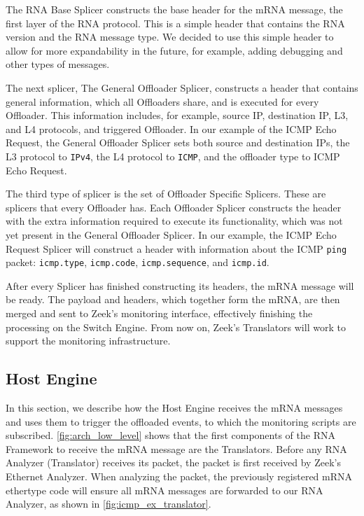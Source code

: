 The RNA Base Splicer constructs the base header for the mRNA message, the first layer of the RNA protocol. This is a simple header that contains the RNA version and the RNA message type. We decided to use this simple header to allow for more expandability in the future, for example, adding debugging and other types of messages.


The next splicer, The General Offloader Splicer, constructs a header that contains general information, which all Offloaders share, and is executed for every Offloader. This information includes, for example, source IP, destination IP, L3, and L4 protocols, and triggered Offloader. In our example of the ICMP Echo Request, the General Offloader Splicer sets both source and destination IPs, the L3 protocol to \texttt{IPv4}, the L4 protocol to \texttt{ICMP}, and the offloader type to ICMP Echo Request.

The third type of splicer is the set of Offloader Specific Splicers. These are splicers that every Offloader has. Each Offloader Splicer constructs the header with the extra information required to execute its functionality, which was not yet present in the General Offloader Splicer. In our example, the ICMP Echo Request Splicer will construct a header with information about the ICMP \texttt{ping} packet: \texttt{icmp.type}, \texttt{icmp.code}, \texttt{icmp.sequence}, and \texttt{icmp.id}.



After every Splicer has finished constructing its headers, the mRNA message will be ready. The payload and headers, which together form the mRNA, are then merged and sent to Zeek's monitoring interface, effectively finishing the processing on the Switch Engine. From now on, Zeek's Translators will work to support the monitoring infrastructure.

\subsection{Host Engine}

In this section, we describe how the Host Engine receives the mRNA messages and uses them to trigger the offloaded events, to which the monitoring scripts are subscribed. \autoref{fig:arch_low_level} shows that the first components of the RNA Framework to receive the mRNA message are the Translators. Before any RNA Analyzer (Translator) receives its packet, the packet is first received by Zeek's Ethernet Analyzer. When analyzing the packet, the previously registered mRNA ethertype code will ensure all mRNA messages are forwarded to our RNA Analyzer, as shown in \autoref{fig:icmp_ex_translator}.

